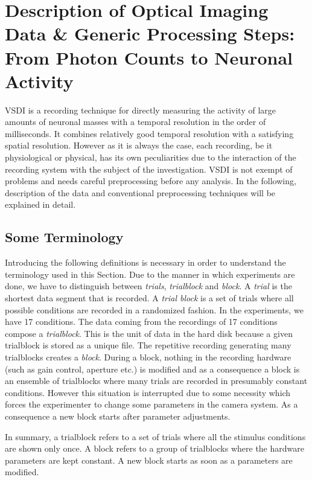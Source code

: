 
\section{Description of Optical Imaging Data \& Generic Processing
Steps: From Photon Counts to Neuronal Activity} 

\label{app_oi} 


VSDI is a recording technique for directly measuring the activity of large
amounts of neuronal masses with a temporal resolution in the order of
milliseconds. It combines relatively good temporal resolution with a
satisfying spatial resolution. However as it is always the case, each
recording, be it physiological or physical, has its own peculiarities due
to the interaction of the recording system with the subject of the
investigation. VSDI is not exempt of problems and needs careful
preprocessing before any analysis. In the following, description of the
data and conventional preprocessing techniques will be explained in detail.

\subsection{Some Terminology}

Introducing the following definitions is necessary in order to understand
the terminology used in this Section. Due to the manner in which
experiments are done, we have to distinguish between \textit{trials},
\textit{trialblock} and \textit{block}. A \textit{trial} is the shortest
data segment that is recorded. A \textit{trial block} is a set of trials
where all possible conditions are recorded in a randomized fashion. In the
experiments, we have 17 conditions. The data coming from the recordings of
17 conditions compose a \textit{trialblock}. This is the unit of data in
the hard disk because a given trialblock is stored as a unique file. The
repetitive recording generating many trialblocks creates a \textit{block}.
During a block, nothing in the recording hardware (such as gain control,
aperture etc.) is modified and as a consequence a block is an ensemble of
trialblocks where many trials are recorded in presumably constant
conditions. However this situation is interrupted due to some necessity
which forces the experimenter to change some parameters in the camera
system. As a consequence a new block starts after parameter adjustments. 

In summary, a trialblock refers to a set of trials
where all the stimulus conditions are shown only once. A block refers to a
group of trialblocks where the hardware parameters are kept constant. A new
block starts as soon as a parameters are modified.   

